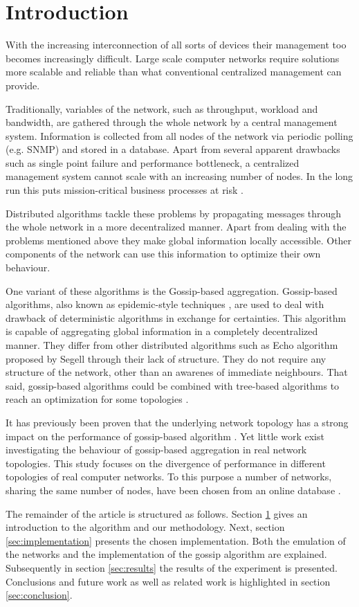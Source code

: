 \section{Introduction}
\label{sec:theory}
With the increasing interconnection of all sorts of devices their management too becomes increasingly difficult. Large scale computer networks require solutions more scalable and reliable than what conventional centralized management can provide.

Traditionally, variables of the network, such as throughput, workload and bandwidth, are gathered through the whole network by a central management system. Information is collected from all nodes of the network via periodic polling (e.g. SNMP) and stored in a database. Apart from several apparent drawbacks such as single point failure and performance bottleneck, a centralized management system cannot scale with an increasing number of nodes. In the long run this puts mission-critical business processes at risk \cite{Stadler529980}.

Distributed algorithms tackle these problems by propagating messages through the whole network in a more decentralized manner. Apart from dealing with the problems mentioned above they make global information locally accessible. Other components of the network can use this information to optimize their own behaviour\cite{jelasity_gossip-based_2005}.

One variant of these algorithms is the Gossip-based aggregation. Gossip-based algorithms, also known as epidemic-style techniques \cite{I.Gupta2006}, are used to deal with drawback of deterministic algorithms in exchange for certainties. This algorithm is capable of aggregating global information in a completely decentralized manner. They differ from other distributed algorithms such as Echo algorithm proposed by Segell \cite{SegallG89} through their lack of structure. They do not require any structure of the network, other than an awarenes of immediate neighbours. That said, gossip-based algorithms could be combined with tree-based algorithms to reach an optimization for some topologies \cite{KyasanurCG06}.

It has previously been proven that the underlying network topology has a strong impact on the performance of gossip-based algorithm \cite{5929538}\cite{jelasity_gossip-based_2005}. Yet little work exist investigating the behaviour of gossip-based aggregation in real network topologies. This study focuses on the divergence of performance in different topologies of real computer networks. To this purpose a number of networks, sharing the same number of nodes, have been chosen from an online database \cite{knight_internet_2011}.

The remainder of the article is structured as follows. Section \ref{sec:theory} gives an introduction to the algorithm and our methodology. Next, section \ref{sec:implementation} presents the chosen implementation. Both the emulation of the networks and the implementation of the gossip algorithm are explained. Subsequently in section \ref{sec:results} the results of the experiment is presented. Conclusions and future work as well as related work is highlighted in section \ref{sec:conclusion}.
